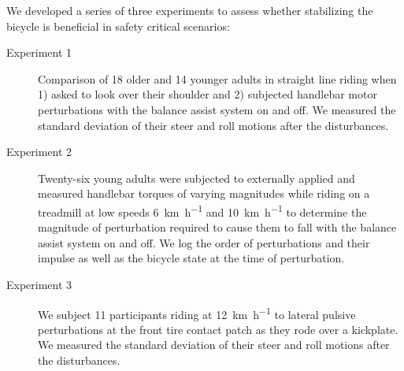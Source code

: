 \documentclass{icsc}
\def\kph{\kilo\meter\per\hour}
\begin{document}
We developed a series of three experiments to assess whether stabilizing the
bicycle is beneficial in safety critical scenarios:
\begin{description}
  \item[Experiment 1] Comparison of 18 older and 14 younger adults in straight
    line riding when 1) asked to look over their shoulder and 2) subjected
    handlebar motor perturbations with the balance assist system on and off. We
    measured the standard deviation of their steer and roll motions after the
    disturbances.
  \item[Experiment 2] Twenty-six young adults were subjected to externally
    applied and measured handlebar torques of varying magnitudes while riding
    on a treadmill at low speeds 6~\si{\kph} and 10~\si{\kph} to determine the
    magnitude of perturbation required to cause them to fall with the balance
    assist system on and off. We log the order of perturbations and their
    impulse as well as the bicycle state at the time of perturbation.
  \item[Experiment 3] We subject 11 participants riding at 12~\si{\kph} to
    lateral pulsive perturbations at the front tire contact patch as they rode
    over a kickplate. We measured the standard deviation of their steer and
    roll motions after the disturbances.
\end{description}
\end{document}
